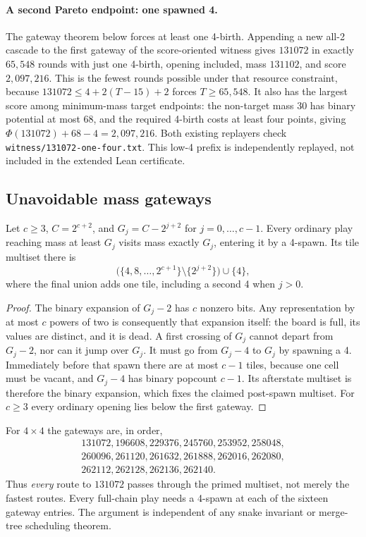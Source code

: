 \paragraph{A second Pareto endpoint: one spawned 4.}
The gateway theorem below forces at least one 4-birth. Appending a new
all-2 cascade to the first gateway of the score-oriented witness gives
$131072$ in exactly $65{,}548$ rounds with just one 4-birth, opening
included, mass $131102$, and score $2{,}097{,}216$. This is the fewest
rounds possible under that resource constraint, because
$131072\le4+2(T-15)+2$ forces $T\ge65{,}548$.
It also has the largest score among minimum-mass target endpoints:
the non-target mass 30 has binary potential at most 68, and the required
4-birth costs at least four points, giving
$\Phi(131072)+68-4=2{,}097{,}216$.
Both existing replayers check \texttt{witness/131072-one-four.txt}.
This low-4 prefix is independently replayed, not included in the extended
Lean certificate.

\subsection{Unavoidable mass gateways}

\begin{theorem}\label{thm:gateways}
Let $c\ge3$, $C=2^{c+2}$, and $G_j=C-2^{j+2}$ for
$j=0,\ldots,c-1$. Every ordinary play reaching mass at least $G_j$
visits mass exactly $G_j$, entering it by a 4-spawn. Its tile multiset
there is
\[
 \bigl(\{4,8,\ldots,2^{c+1}\}\setminus\{2^{j+2}\}\bigr)\cup\{4\},
\]
where the final union adds one tile, including a second 4 when $j>0$.
\end{theorem}
\begin{proof}
The binary expansion of $G_j-2$ has $c$ nonzero bits. Any representation
by at most $c$ powers of two is consequently that expansion itself:
the board is full, its values are distinct, and it is dead. A first
crossing of $G_j$ cannot depart from $G_j-2$, nor can it jump over
$G_j$. It must go from $G_j-4$ to $G_j$ by spawning a 4.
Immediately before that spawn there are at most $c-1$ tiles, because
one cell must be vacant, and $G_j-4$ has binary popcount $c-1$.
Its afterstate multiset is therefore the binary expansion, which fixes
the claimed post-spawn multiset. For $c\ge3$ every ordinary opening
lies below the first gateway.
\end{proof}

For $4\times4$ the gateways are, in order,
\[
\begin{gathered}
131072,196608,229376,245760,253952,258048,\\
260096,261120,261632,261888,262016,262080,\\
262112,262128,262136,262140.
\end{gathered}
\]
Thus \emph{every} route to $131072$ passes through the primed multiset,
not merely the fastest routes. Every full-chain play needs a 4-spawn
at each of the sixteen gateway entries. The argument is independent of
any snake invariant or merge-tree scheduling theorem.

